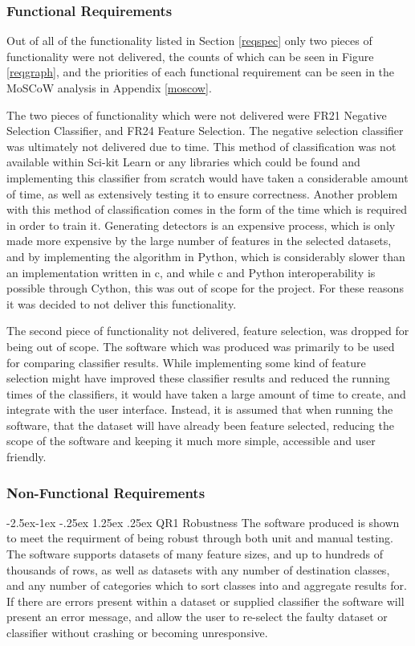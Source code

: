 \documentclass[12pt,a4paper]{article}
\makeatletter
\renewcommand\paragraph{\@startsection{paragraph}{4}{\z@}%
  {-2.5ex\@plus -1ex \@minus -.25ex}%
  {1.25ex \@plus .25ex}%
  {\normalfont\normalsize\bfseries}}
\makeatother
\begin{document}
\subsubsection{Functional Requirements}
Out of all of the functionality listed in Section \ref{reqspec} only two pieces of functionality were not delivered, the counts of which can be seen in Figure \ref{reqgraph}, and the priorities of each functional requirement can be seen in the MoSCoW analysis in Appendix \ref{moscow}.

The two pieces of functionality which were not delivered were FR21 Negative Selection Classifier, and FR24 Feature Selection. The negative selection classifier was ultimately not delivered due to time. This method of classification was not available within Sci-kit Learn or any libraries which could be found and implementing this classifier from scratch would have taken a considerable amount of time, as well as extensively testing it to ensure correctness. Another problem with this method of classification comes in the form of the time which is required in order to train it. Generating detectors is an expensive process, which is only made more expensive by the large number of features in the selected datasets, and by implementing the algorithm in Python, which is considerably slower than an implementation written in c, and while c and Python interoperability is possible through Cython, this was out of scope for the project. For these reasons it was decided to not deliver this functionality.

The second piece of functionality not delivered, feature selection, was dropped for being out of scope.
The software which was produced was primarily to be used for comparing classifier results. While implementing some kind of feature selection might have improved these classifier results and reduced the running times of the classifiers, it would have taken a large amount of time to create, and integrate with the user interface. Instead, it is assumed that when running the software, that the dataset will have already been feature selected, reducing the scope of the software and keeping it much more simple, accessible and user friendly.

\subsubsection{Non-Functional Requirements}
\paragraph{QR1 Robustness}
The software produced is shown to meet the requirment of being robust through both unit and manual testing. The software supports datasets of many feature sizes, and up to hundreds of thousands of rows, as well as datasets with any number of destination classes, and any number of categories which to sort classes into and aggregate results for. If there are errors present within a dataset or supplied classifier the software will present an error message, and allow the user to re-select the faulty dataset or classifier without crashing or becoming unresponsive.
\end{document}
